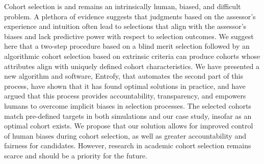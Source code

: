 \documentclass[10pt,letterpaper]{article}
\begin{document}
Cohort selection is and remains an intrinsically human, biased, and difficult problem.
A plethora of evidence suggests that judgments based on the assessor's experience and intuition often lead to selections that align with the assessor's biases and lack predictive power with respect to selection outcomes.
We suggest here that a two-step procedure based on a blind merit selection followed by an algorithmic cohort selection based on extrinsic criteria can produce cohorts whose attributes align with uniquely defined cohort characteristics.
We have presented a new algorithm and software, Entrofy, that automates the second part of this process, have shown that it has found optimal solutions in practice, and have argued that this process provides accountability, transparency, and empowers humans to overcome implicit biases in selection processes.
The selected cohorts match pre-defined targets in both simulations and our case study, insofar as an optimal cohort exists.
We propose that our solution allows for improved control of human biases during cohort selection, as well as greater accountability and fairness for candidates.
However, research in academic cohort selection remains scarce and should be a priority for the future. 





\end{document}
